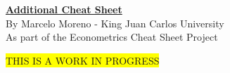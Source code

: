 \documentclass[10pt, a4paper, landscape]{extarticle}
\begin{document}
\setlength{\footskip}{12pt}

\begin{multicols}{3} %

\begin{center}
	\textbf{\LARGE \href{https://github.com/marcelomijas/econometrics-cheatsheet}{Additional Cheat Sheet}}
	\\ {\footnotesize By Marcelo Moreno - King Juan Carlos University}
	\\ {\footnotesize As part of the Econometrics Cheat Sheet Project}
\end{center}

\colorbox{yellow}{THIS IS A WORK IN PROGRESS}


\end{multicols}
\end{document}
